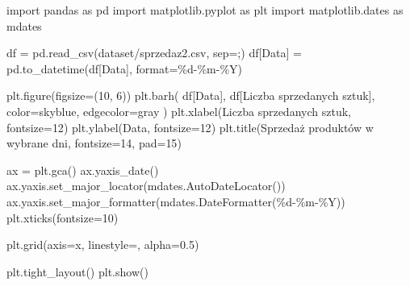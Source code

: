 \documentclass[
  polish,
  letterpaper,
  DIV=11,
  numbers=noendperiod]{scrreprt}
\newenvironment{Shaded}{\begin{snugshade}}{\end{snugshade}}
\newcommand{\BuiltInTok}[1]{\textcolor[rgb]{0.00,0.23,0.31}{#1}}
\newcommand{\DecValTok}[1]{\textcolor[rgb]{0.68,0.00,0.00}{#1}}
\newcommand{\FloatTok}[1]{\textcolor[rgb]{0.68,0.00,0.00}{#1}}
\newcommand{\ImportTok}[1]{\textcolor[rgb]{0.00,0.46,0.62}{#1}}
\newcommand{\NormalTok}[1]{\textcolor[rgb]{0.00,0.23,0.31}{#1}}
\newcommand{\OperatorTok}[1]{\textcolor[rgb]{0.37,0.37,0.37}{#1}}
\newcommand{\SpecialCharTok}[1]{\textcolor[rgb]{0.37,0.37,0.37}{#1}}
\newcommand{\StringTok}[1]{\textcolor[rgb]{0.13,0.47,0.30}{#1}}
\begin{document}
\begin{Shaded}
\begin{Highlighting}[]
\ImportTok{import}\NormalTok{ pandas }\ImportTok{as}\NormalTok{ pd}
\ImportTok{import}\NormalTok{ matplotlib.pyplot }\ImportTok{as}\NormalTok{ plt}
\ImportTok{import}\NormalTok{ matplotlib.dates }\ImportTok{as}\NormalTok{ mdates}

\NormalTok{df }\OperatorTok{=}\NormalTok{ pd.read\_csv(}\StringTok{\textquotesingle{}dataset/sprzedaz2.csv\textquotesingle{}}\NormalTok{, sep}\OperatorTok{=}\StringTok{\textquotesingle{};\textquotesingle{}}\NormalTok{)}
\NormalTok{df[}\StringTok{\textquotesingle{}Data\textquotesingle{}}\NormalTok{] }\OperatorTok{=}\NormalTok{ pd.to\_datetime(df[}\StringTok{\textquotesingle{}Data\textquotesingle{}}\NormalTok{], }\BuiltInTok{format}\OperatorTok{=}\StringTok{\textquotesingle{}}\SpecialCharTok{\%d}\StringTok{{-}\%m{-}\%Y\textquotesingle{}}\NormalTok{)}

\NormalTok{plt.figure(figsize}\OperatorTok{=}\NormalTok{(}\DecValTok{10}\NormalTok{, }\DecValTok{6}\NormalTok{))}
\NormalTok{plt.barh(}
\NormalTok{    df[}\StringTok{\textquotesingle{}Data\textquotesingle{}}\NormalTok{],}
\NormalTok{    df[}\StringTok{\textquotesingle{}Liczba sprzedanych sztuk\textquotesingle{}}\NormalTok{],}
\NormalTok{    color}\OperatorTok{=}\StringTok{\textquotesingle{}skyblue\textquotesingle{}}\NormalTok{,}
\NormalTok{    edgecolor}\OperatorTok{=}\StringTok{\textquotesingle{}gray\textquotesingle{}}
\NormalTok{)}
\NormalTok{plt.xlabel(}\StringTok{\textquotesingle{}Liczba sprzedanych sztuk\textquotesingle{}}\NormalTok{, fontsize}\OperatorTok{=}\DecValTok{12}\NormalTok{)}
\NormalTok{plt.ylabel(}\StringTok{\textquotesingle{}Data\textquotesingle{}}\NormalTok{, fontsize}\OperatorTok{=}\DecValTok{12}\NormalTok{)}
\NormalTok{plt.title(}\StringTok{\textquotesingle{}Sprzedaż produktów w wybrane dni\textquotesingle{}}\NormalTok{, fontsize}\OperatorTok{=}\DecValTok{14}\NormalTok{, pad}\OperatorTok{=}\DecValTok{15}\NormalTok{)}

\NormalTok{ax }\OperatorTok{=}\NormalTok{ plt.gca()}
\NormalTok{ax.yaxis\_date()}
\NormalTok{ax.yaxis.set\_major\_locator(mdates.AutoDateLocator())}
\NormalTok{ax.yaxis.set\_major\_formatter(mdates.DateFormatter(}\StringTok{\textquotesingle{}}\SpecialCharTok{\%d}\StringTok{{-}\%m{-}\%Y\textquotesingle{}}\NormalTok{))}
\NormalTok{plt.xticks(fontsize}\OperatorTok{=}\DecValTok{10}\NormalTok{)}

\NormalTok{plt.grid(axis}\OperatorTok{=}\StringTok{\textquotesingle{}x\textquotesingle{}}\NormalTok{, linestyle}\OperatorTok{=}\StringTok{\textquotesingle{}{-}{-}\textquotesingle{}}\NormalTok{, alpha}\OperatorTok{=}\FloatTok{0.5}\NormalTok{)}

\NormalTok{plt.tight\_layout()}
\NormalTok{plt.show()}
\end{Highlighting}
\end{Shaded}
\end{document}

